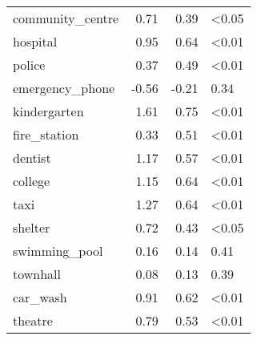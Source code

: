 \begin{tabular}{lrrl}
community\_centre &      0.71 &       0.39 &   <0.05 \\
hospital         &      0.95 &       0.64 &   <0.01 \\
police           &      0.37 &       0.49 &   <0.01 \\
emergency\_phone  &     -0.56 &      -0.21 &    0.34 \\
kindergarten     &      1.61 &       0.75 &   <0.01 \\
fire\_station     &      0.33 &       0.51 &   <0.01 \\
dentist          &      1.17 &       0.57 &   <0.01 \\
college          &      1.15 &       0.64 &   <0.01 \\
taxi             &      1.27 &       0.64 &   <0.01 \\
shelter          &      0.72 &       0.43 &   <0.05 \\
swimming\_pool    &      0.16 &       0.14 &    0.41 \\
townhall         &      0.08 &       0.13 &    0.39 \\
car\_wash         &      0.91 &       0.62 &   <0.01 \\
theatre          &      0.79 &       0.53 &   <0.01 \\
\bottomrule
\end{tabular}
